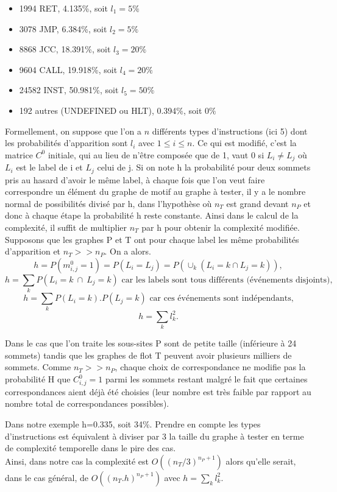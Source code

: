 \begin{itemize}
 \item 1994 RET, 4.135\%, soit $l_1=5\%$
 \item 3078 JMP, 6.384\%, soit $l_2=5\%$
 \item 8868 JCC, 18.391\%, soit $l_3=20\%$
 \item 9604 CALL, 19.918\%, soit $l_4=20\%$
 \item 24582 INST, 50.981\%, soit $l_5=50\%$
 \item 192 autres (UNDEFINED ou HLT), 0.394\%, soit $0\%$
\\
\end{itemize}

Formellement, on suppose que l'on a $n$ différents types d'instructions (ici 5) dont les probabilités d'apparition sont $l_i$ avec $1\le i\le n$.
Ce qui est modifié, c'est la matrice $C^0$ initiale, qui au lieu de n'être composée que de 1, vaut 0 si $L_i\ne L_j$ où $L_i$ est le label de i et $L_j$ celui de j. Si on note h la probabilité pour deux sommets pris au hasard d'avoir
le même label, à chaque fois que l'on veut faire correspondre un élément du graphe de motif au graphe à tester, il y a le nombre
normal de possibilités divisé par h, dans l'hypothèse où $n_T$ est grand devant $n_P$ et donc à chaque étape la probabilité h reste
constante. Ainsi dans le calcul de la complexité, il suffit de multiplier $n_T$ par h pour obtenir la complexité modifiée.
\\

Supposons que les graphes P et T ont pour chaque label les même probabilités d'apparition et $n_T >> n_P.$
On a alors. $$h=P(m^0_{i, j}=1)=P(L_i=L_j)=P(\cup_k(L_i=k \cap L_j=k)),$$
$$h=\sum_kP(L_i=k\ \cap\ L_j=k) \mbox{ car les labels sont tous différents (événements disjoints),}$$
$$h=\sum_kP(L_i=k).P(L_j=k) \mbox{ car ces événements sont indépendants,}$$
$$h=\sum_kl_k^2.$$

Dans le cas que l'on traite les sous-sites P sont de petite taille (inférieure à 24 sommets) tandis que les graphes de flot T peuvent avoir plusieurs milliers de sommets.
Comme $n_T >> n_P$, chaque choix de correspondance ne modifie pas la probabilité H que $C^0_{i, j}=1$ parmi les sommets restant
malgré le fait que certaines correspondances
aient déjà été choisies (leur nombre est très faible par rapport au nombre total de correspondances possibles).

Dans notre exemple h=0.335, soit 34\%. Prendre en compte les types d'instructions est équivalent à diviser par 3 la taille du graphe à tester
en terme de complexité temporelle dans le pire des cas.
\\
Ainsi, dans notre cas la complexité est $O((n_T/3)^{n_P+1})$ alors qu'elle serait, dans le cas général, de $O((n_T.h)^{n_P+1})$ avec $h=\sum_kl_k^2$.

